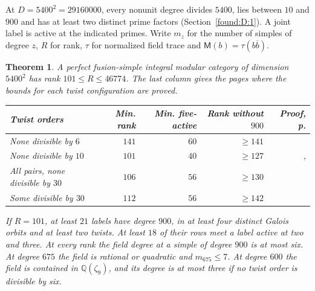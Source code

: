 \documentclass[11pt,a4paper]{article}
\numberwithin{equation}{section}
\newtheorem{theorem}{Theorem}[section]
\theoremstyle{remark}
\newcommand{\QQ}{\mathbb Q}
\begin{document}
At $D=5400^2=29160000$, every nonunit degree divides $5400$, lies between $10$ and $900$ and has at least two distinct prime factors (Section~\ref{found:D:1}). A joint label is active at the indicated primes. Write $m_z$ for the number of simples of degree $z$, $R$ for rank, $\tau$ for normalized field trace and $\mathsf M(b)=\tau(b\overline b)$. 
\begin{theorem}\label{por:ranktheorem}
A perfect fusion-simple integral modular category of dimension $5400^2$ has rank $101\le R\le46774$. The last column gives the pages where the bounds for each twist configuration are proved.
\begin{center}
\begin{tabular}{@{}lrrrr@{}}\toprule
Twist orders & Min. rank & Min. five-active & Rank without $900$ & Proof, p.\\\midrule
None divisible by $6$  & $141$ & $60$ & $\ge141$ & \pageref{por:count-no-six}\\
None divisible by $10$ & $101$ & $40$ & $\ge127$ & \pageref{por:count-no-ten}, \pageref{por:certificate}\\
All pairs, none divisible by $30$ & $106$ & $56$ & $\ge130$ & \pageref{por:count-triangle}\\
Some divisible by $30$ & $112$ & $56$ & $\ge142$ & \pageref{por:count-triangle}\\\bottomrule
\end{tabular}
\end{center}

If $R=101$, at least $21$ labels have degree $900$, in at least four distinct Galois orbits and at least two twists. At least $18$ of their rows meet a label active at two and three. At every rank the field degree at a simple of degree $900$ is at most six. At degree $675$ the field is rational or quadratic and $m_{675}\le7$. At degree $600$ the field is contained in $\QQ(\zeta_9)$, and its degree is at most three if no twist order is divisible by six.
\end{theorem}
\end{document}
